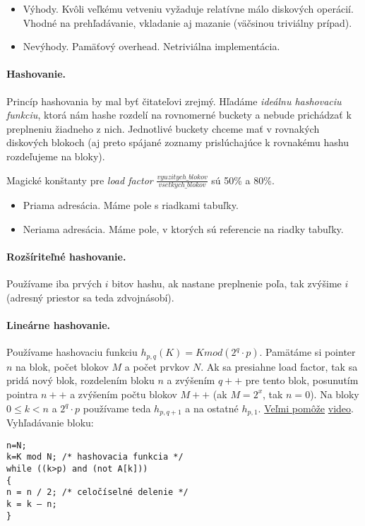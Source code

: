 \documentclass[10pt,a4paper]{article}
\begin{document}
\begin{itemize}
\item Výhody. Kvôli veľkému vetveniu vyžaduje relatívne málo diskových
      operácií. Vhodné na prehľadávanie, vkladanie aj mazanie (väčsinou triviálny prípad). 
\item Nevýhody. Pamäťový overhead. Netriviálna implementácia. 
\end{itemize}

\paragraph{Hashovanie.}
Princíp hashovania by mal byť čitateľovi zrejmý. Hľadáme \emph{ideálnu hashovaciu funkciu},
ktorá nám hashe rozdelí na rovnomerné buckety a nebude prichádzať k preplneniu žiadneho z nich. 
Jednotlivé buckety chceme mať v rovnakých diskových blokoch (aj preto spájané zoznamy prislúchajúce k rovnakému hashu rozdeľujeme na bloky). 

Magické konštanty pre \emph{load factor} $\frac{vyuzitych\_blokov}{vsetkych\_blokov}$ sú 50\% a 80\%. 

\begin{itemize}
\item Priama adresácia. Máme pole s riadkami tabuľky.
\item Neriama adresácia. Máme pole, v ktorých sú referencie na riadky tabuľky. 
\end{itemize}

\paragraph{Rozšíriteľné hashovanie.} 
Používame iba prvých $i$ bitov hashu, ak nastane preplnenie poľa, tak zvýšime $i$ (adresný priestor sa teda zdvojnásobí). 

\paragraph{Lineárne hashovanie.}
Používame hashovaciu funkciu $h_{p,q}(K)=K mod (2^q \cdot p)$. Pamätáme si pointer $n$ na blok, počet blokov $M$ a počet prvkov $N$.
Ak sa presiahne load factor, tak sa pridá nový blok, rozdelením bloku $n$ a zvýšením $q++$ pre tento blok, posunutím pointra $n++$ a zvýšením počtu blokov $M++$ (ak $M=2^x$, tak $n=0$).
Na bloky $0 \leq k < n$ a $2^q \cdot p$ používame teda $h_{p,q+1}$ a na ostatné $h_{p,1}$.
\underline{Veľmi pomôže} \href{http://www.youtube.com/watch?v=Yw1ts57uL7c}{video}. Vyhľadávanie bloku: 
\begin{verbatim}
n=N;
k=K mod N; /* hashovacia funkcia */
while ((k>p) and (not A[k]))
{
n = n / 2; /* celočíselné delenie */
k = k – n;
}
\end{verbatim} 
\end{document}
